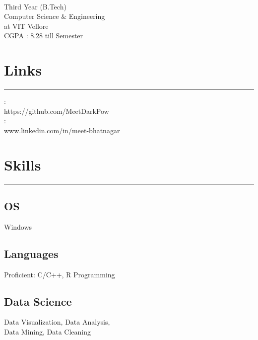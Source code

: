 \documentclass[]{meetresume-class}
\begin{document}
	
	
	\begin{minipage}[t]{0.33\textwidth} 
		\begin{large}
			\\
		\end{large}
		Third Year (B.Tech)\\
		Computer Science $\&$ Engineering\\ 
		at VIT Vellore \\ 
		CGPA : 8.28 till  Semester 
		
		
		\section{Links} 
		\noindent\rule{5cm}{0.6pt}
		
		\href{https://github.com/MeetDarkPow}{}:\\
		https://github.com/MeetDarkPow \\
		\href{https://www.linkedin.com/in/meet-bhatnagar-a41842181/}{}:\\
		www.linkedin.com/in/meet-bhatnagar
		\sectionsep
		\section{Skills}
		\noindent\rule{5cm}{0.6pt}
	
		\subsection{OS}
		Windows
		\vspace{6pt}
		
		\subsection{Languages}
		Proficient: C/C++, R Programming
		\vspace{6pt}
		
		\subsection{Data Science}
		Data Visualization, Data Analysis,\\
		Data Mining, Data Cleaning
		\vspace{6pt}
		

\end{minipage}
\end{document}

